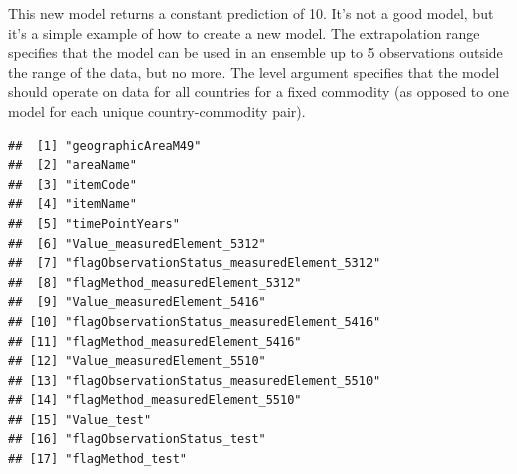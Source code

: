 \documentclass[nojss]{jss}
\begin{document}
This new model returns a constant prediction of 10.  It's not a good model,
but it's a simple example of how to create a new model.  The extrapolation
range specifies that the model can be used in an ensemble up to 5 observations
outside the range of the data, but no more.  The level argument specifies that
the model should operate on data for all countries for a fixed commodity (as
opposed to one model for each unique country-commodity pair).

\begin{knitrout}
\color{fgcolor}\begin{kframe}
\begin{alltt}
\hlopt{$} \hlkwb{=} 
\hlstd{(}   
\end{alltt}
\begin{verbatim}
##  [1] "geographicAreaM49"                         
##  [2] "areaName"                                  
##  [3] "itemCode"                                  
##  [4] "itemName"                                  
##  [5] "timePointYears"                            
##  [6] "Value_measuredElement_5312"                
##  [7] "flagObservationStatus_measuredElement_5312"
##  [8] "flagMethod_measuredElement_5312"           
##  [9] "Value_measuredElement_5416"                
## [10] "flagObservationStatus_measuredElement_5416"
## [11] "flagMethod_measuredElement_5416"           
## [12] "Value_measuredElement_5510"                
## [13] "flagObservationStatus_measuredElement_5510"
## [14] "flagMethod_measuredElement_5510"           
## [15] "Value_test"                                
## [16] "flagObservationStatus_test"                
## [17] "flagMethod_test"
\end{verbatim}
\end{kframe}


\end{knitrout}
\end{document}
